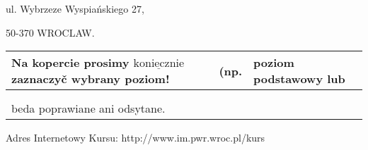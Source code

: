 \documentclass[a4paper,12pt]{article}
\begin{document}
ul. Wybrzeze Wyspiańskiego 27,

50-370 WROCLAW.
\begin{center}
\begin{tabular}{|l|l|l|}
\hline
\multicolumn{1}{|l|}{Na kopercie prosimy $\underline{\mathrm{k}\mathrm{o}\mathrm{n}\mathrm{i}\mathrm{e}\mathrm{c}\mathrm{z}\mathrm{n}\mathrm{i}\mathrm{e}}$ zaznaczyč wybrany poziom!}&	\multicolumn{1}{|l|}{(np.}&	\multicolumn{1}{|l|}{poziom podstawowy lub}	\\
\hline
	\\
	\\
\multicolumn{1}{|l|}{beda poprawiane ani odsytane.}	\\
\cline{1-1}
\end{tabular}

\end{center}
Adres Internetowy Kursu: http://www.im.pwr.wroc.pl/kurs
\end{document}
